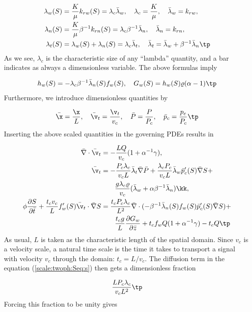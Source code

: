 \documentclass[graybox,envcountchap,sectrefs,final]{svmonodo}
\begin{document}
\begin{align*}
\lambda_w(S) &= \frac{K}{\mu}k_{rw}(S) = \lambda_c\bar\lambda_w,\quad
\lambda_c=\frac{K}{\mu},\quad \bar\lambda_w = k_{rw},\\ 
\lambda_n(S) &= \frac{K}{\mu}\beta^{-1}k_{rn}(S) = \lambda_c\beta^{-1}\bar\lambda_n,
\quad\bar\lambda_n = k_{rn},\\ 
\lambda_t(S) &= \lambda_w(S) + \lambda_n(S) = \lambda_c\bar\lambda_t,\quad
\bar\lambda_t = \bar \lambda_w +
\beta^{-1}\bar\lambda_n\tp
\end{align*}
As we see, $\lambda_c$ is the characteristic size of any ``lambda''
quantity, and a bar indicates as always a dimensionless variable.
The above formulas imply

\[ h_w(S) = -\lambda_c\beta^{-1}\bar\lambda_n(S)f_w(S),\quad
G_w(S) = h_w(S)\varrho(\alpha - 1)\tp\]
Furthermore, we introduce dimensionless quantities by

\[ \bar\x = \frac{\x}{L},\quad \bar\v_t = \frac{\v_t}{v_c},\quad
\bar P = \frac{P}{P_c},\quad\bar p_c = \frac{p_c}{P_c}\tp\]
Inserting the above scaled quantities in the governing PDEs results in

\begin{align}
\bar\nabla\cdot\bar\v_t &= -\frac{LQ}{v_c}(1 + \alpha^{-1}\gamma),
\label{scale:twoph:Peq:s0}\\ 
\bar\v_t &= -\frac{P_c\lambda_c}{v_c L}\bar\lambda_t\bar\nabla\bar P +
\frac{\lambda_c P_c}{v_c L}\bar\lambda_w \bar p_c'(S)\bar\nabla S +\nonumber\\ 
&\quad\quad\frac{g\lambda_c\varrho}{v_c}
(\bar\lambda_w + \alpha\beta^{-1}\bar\lambda_n)\kk,
\label{scale:twoph:v_teq:s0}\\ 
\phi\frac{\partial S}{\partial\bar t} + \frac{t_cv_c}{L}f_w'(S)\bar\v_t\cdot
\bar\nabla S &=
\frac{t_c P_c\lambda_c}{L^2}
\bar\nabla\cdot(-\beta^{-1}\bar\lambda_n(S)f_w(S)\bar p_c'(S)\bar\nabla S) + \nonumber\\ 
&\quad\quad \frac{t_c g}{L}\frac{\partial G_w}{\partial\bar z} + t_c f_w Q(1+\alpha^{-1}\gamma) - t_cQ\tp
\label{scale:twoph:Seq:s0}
\end{align}
As usual, $L$ is taken as the characteristic length of the spatial domain.
Since $v_c$ is a velocity scale, a natural time scale is the time it
takes to transport a signal with velocity $v_c$ through the domain:
$t_c = L/v_c$. The diffusion term in the equation
(\ref{scale:twoph:Seq:s}) then gets
a dimensionless fraction

\[ \frac{L P_c\lambda_c}{v_c L^2}\tp\]
Forcing this fraction to be unity gives
\end{document}
